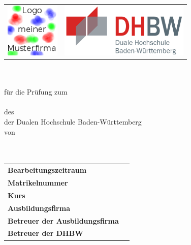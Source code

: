 \begin{titlepage}

\begin{longtable}{p{} p{}}
  {\includegraphics[height=2.6cm]{images/logo.png}} & 
  {\includegraphics[height=2.6cm]{images/dhbw.png}}
\end{longtable}

\begin{center}
  \vspace*{10mm}	{\LARGE\bf \titel }\\
  \vspace*{10mm}	{\large\bf \arbeit}\\
  \vspace*{10mm}	für die Prüfung zum\\
  \vspace*{10mm}	{\bf \abschluss}\\
  \vspace*{10mm}	des \studiengang\\
  \vspace*{1mm} 	der Dualen Hochschule Baden-Württemberg \dhbw\\
  \vspace*{10mm}	von\\
  \vspace*{1mm} 	{\large\bf \autor}\\
  \vspace*{10mm}	\datumVonBis\\
\end{center}
\vspace*{12mm}
\begin{longtable}{p{}p{}}
  \vspace*{1mm} \textbf{Bearbeitungszeitraum}			&  \zeitraum\\
  \vspace*{1mm} \textbf{Matrikelnummer}					&  \martrikelnr\\
  \vspace*{1mm} \textbf{Kurs}							&  \kurs\\
  \vspace*{1mm} \textbf{Ausbildungsfirma}				&  \firma\\
  \vspace*{1mm} \textbf{Betreuer der Ausbildungsfirma}	&  \betreuer\\
  \vspace*{1mm} \textbf{Betreuer der DHBW}				&  \betreuerDHBW
\end{longtable}
\end{titlepage}
